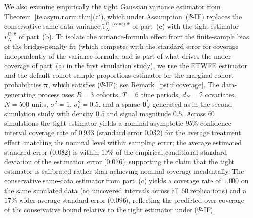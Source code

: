 
We also examine empirically the tight Gaussian variance estimator from Theorem~\ref{te.asym.norm.thm}(c$'$), which under Assumption~($\Psi$-IF) replaces the conservative same-data variance $\tilde{v}_N^{\text{C, (cons)}; \hat{\pi}}$ of part~(c) with the tight estimator $\tilde{v}_N^{\text{C}; \hat{\pi}}$ of part~(b). To isolate the variance-formula effect from the finite-sample bias of the bridge-penalty fit (which competes with the standard error for coverage independently of the variance formula, and is part of what drives the under-coverage of part~(a) in the first simulation study), we use the ETWFE estimator and the default cohort-sample-proportions estimator for the marginal cohort probabilities $\boldsymbol{\pi}$, which satisfies ($\Psi$-IF); see Remark~\ref{psi.if.coverage}. The data-generating process uses $R = 3$ cohorts, $T = 6$ time periods, $d_N = 2$ covariates, $N = 500$ units, $\sigma^2 = 1$, $\sigma_c^2 = 0.5$, and a sparse $\boldsymbol{\theta}_N^*$ generated as in the second simulation study with density $0.5$ and signal magnitude $0.5$. Across $60$ simulations the tight estimator yields a nominal asymptotic $95\%$ confidence interval coverage rate of $0.933$ (standard error $0.032$) for the average treatment effect, matching the nominal level within sampling error; the average estimated standard error ($0.082$) is within $10\%$ of the empirical conditional standard deviation of the estimation error ($0.076$), supporting the claim that the tight estimator is calibrated rather than achieving nominal coverage incidentally. The conservative same-data estimator from part~(c) yields a coverage rate of $1.000$ on the same simulated data (no uncovered intervals across all $60$ replications) and a $17\%$ wider average standard error ($0.096$), reflecting the predicted over-coverage of the conservative bound relative to the tight estimator under ($\Psi$-IF).
